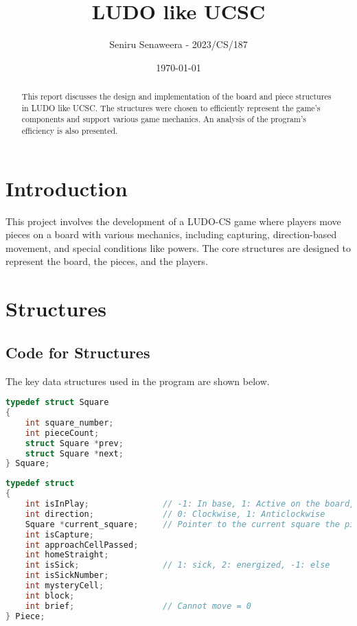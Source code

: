 \documentclass[a4paper,11pt]{article}
\title{LUDO like UCSC}
\author{Seniru Senaweera - 2023/CS/187}
\date{\today}
\begin{document}
\maketitle

\begin{abstract}
This report discusses the design and implementation of the board and piece structures in LUDO like UCSC. The structures were chosen to efficiently represent the game's components and support various game mechanics. An analysis of the program's efficiency is also presented.
\end{abstract}

\section{Introduction}
This project involves the development of a LUDO-CS game where players move pieces on a board with various mechanics, including capturing, direction-based movement, and special conditions like powers. The core structures are designed to represent the board, the pieces, and the players.

\section{Structures}
\subsection{Code for Structures}
The key data structures used in the program are shown below.

\begin{lstlisting}[language=C, caption={Structure to represent each square on the board}]
typedef struct Square
{
    int square_number;
    int pieceCount;
    struct Square *prev;
    struct Square *next;
} Square;
\end{lstlisting}

\begin{lstlisting}[language=C, caption={Structure to represent a piece (pawn) on the board}]
typedef struct
{
    int isInPlay;               // -1: In base, 1: Active on the board, 2: In home straight, 3: Finished
    int direction;              // 0: Clockwise, 1: Anticlockwise
    Square *current_square;     // Pointer to the current square the piece is on
    int isCapture;              
    int approachCellPassed;
    int homeStraight;
    int isSick;                 // 1: sick, 2: energized, -1: else
    int isSickNumber;
    int mysteryCell;
    int block;
    int brief;                  // Cannot move = 0
} Piece;
\end{lstlisting}
\end{document}
